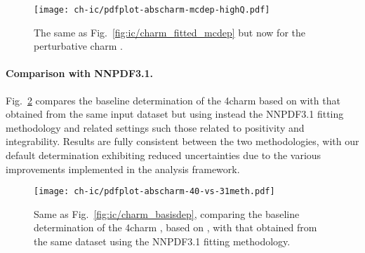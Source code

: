 \begin{figure}[t]
  \begin{center}
    \texttt{[image: ch-ic/pdfplot-abscharm-mcdep-highQ.pdf]}
    \caption{\small The same as Fig.~\ref{fig:ic/charm_fitted_mcdep} but now
    for the perturbative charm \pdf.
  \label{fig:ic/charm_pert_mcdep} }
\end{center}
\end{figure}



  \paragraph{Comparison with NNPDF3.1.}
  Fig.~\ref{fig:ic/pdfplot-abscharm-40-vs-31meth} compares
  the baseline determination of the 4\fns charm \pdf based
  on  with that obtained
  from the same input dataset but using instead
  the NNPDF3.1 fitting methodology and related settings such those related to positivity
  and integrability.
  Results are fully consistent between the two methodologies, with our default
  determination exhibiting reduced uncertainties due to
  the various improvements implemented
  in the  analysis framework.
  
\begin{figure}[t]
  \begin{center}
    \texttt{[image: ch-ic/pdfplot-abscharm-40-vs-31meth.pdf]}
    \caption{\small Same as Fig.~\ref{fig:ic/charm_basisdep}, comparing
      the baseline determination of the 4\fns charm \pdf, based
      on , with that obtained
      from the same dataset using the NNPDF3.1 fitting methodology.
  \label{fig:ic/pdfplot-abscharm-40-vs-31meth} }
\end{center}
\end{figure}

